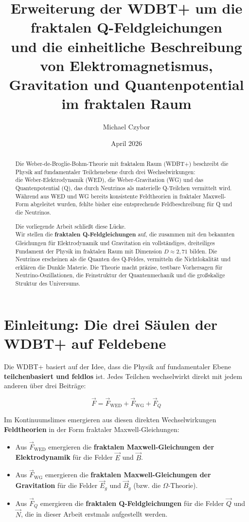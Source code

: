 \documentclass[12pt,a4paper]{article}
\title{Erweiterung der WDBT+ um die fraktalen Q-Feldgleichungen\\ und die einheitliche Beschreibung von Elektromagnetismus,\\ Gravitation und Quantenpotential im fraktalen Raum}
\author{Michael Czybor}
\date{April 2026}
\begin{document}
\maketitle

\begin{abstract}
Die Weber-de-Broglie-Bohm-Theorie mit fraktalem Raum (WDBT+) beschreibt die Physik auf fundamentaler Teilchenebene durch drei Wechselwirkungen:\\die Weber-Elektrodynamik (WED),
die Weber-Gravitation (WG) und das Quantenpotential (Q), das durch Neutrinos als materielle Q-Teilchen vermittelt wird. Während aus WED und WG bereits konsistente Feldtheorien in
fraktaler Maxwell-Form abgeleitet wurden, fehlte bisher eine entsprechende Feldbeschreibung für Q und die Neutrinos.

Die vorliegende Arbeit schließt diese Lücke.\\Wir stellen die \textbf{fraktalen Q-Feldgleichungen} auf, die zusammen mit den bekannten Gleichungen für Elektrodynamik und Gravitation
ein vollständiges, dreiteiliges Fundament der Physik im fraktalen Raum mit Dimension \(D \approx 2,71\) bilden. Die Neutrinos erscheinen als die Quanten des Q-Feldes, vermitteln die
Nichtlokalität und erklären die Dunkle Materie. Die Theorie macht präzise, testbare Vorhersagen für Neutrino-Oszillationen, die Feinstruktur der Quantenmechanik und die großskalige
Struktur des Universums.
\end{abstract}

\tableofcontents

\newpage

\section{Einleitung: Die drei Säulen der WDBT+ auf Feldebene}

Die WDBT+ basiert auf der Idee, dass die Physik auf fundamentaler Ebene \textbf{teilchenbasiert und feldlos} ist. Jedes Teilchen wechselwirkt direkt mit jedem anderen über drei Beiträge:

\[
\vec{F} = \vec{F}_{\text{WED}} + \vec{F}_{\text{WG}} + \vec{F}_Q
\]

Im Kontinuumslimes emergieren aus diesen direkten Wechselwirkungen \textbf{Feldtheorien} in der Form fraktaler Maxwell-Gleichungen:

\begin{itemize}
    \item Aus \(\vec{F}_{\text{WED}}\) emergieren die \textbf{fraktalen Maxwell-Gleichungen der Elektrodynamik} für die Felder \(\vec{E}\) und \(\vec{B}\).
    \item Aus \(\vec{F}_{\text{WG}}\) emergieren die \textbf{fraktalen Maxwell-Gleichungen der Gravitation} für die Felder \(\vec{E}_g\) und \(\vec{B}_g\) (bzw. die \(\Omega\)-Theorie).
    \item Aus \(\vec{F}_Q\) emergieren die \textbf{fraktalen Q-Feldgleichungen} für die Felder \(\vec{Q}\) und \(\vec{N}\), die in dieser Arbeit erstmals aufgestellt werden.
\end{itemize}
\end{document}

